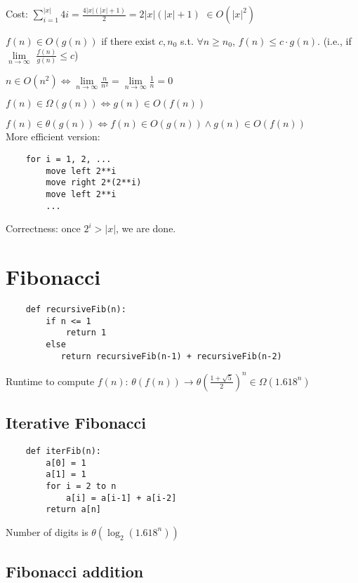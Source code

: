 \documentclass[english,openany]{book}
\begin{document}
    Cost: $\sum_{i=1}^{|x|} 4i = \frac{4|x|(|x|+1)}{2} = 2|x|(|x|+1)$ $\in O(|x|^2)$

    $f(n) \in O(g(n))$ if there exist $c, n_0$ s.t. $\forall n \geq n_0$, $f(n) \leq c \cdot g(n)$. (i.e., if $\lim\limits_{n \rightarrow \infty}$ $\frac{f(n)}{g(n)} \leq c$)

    $n \in O(n^2) \iff \lim\limits_{n \rightarrow \infty} \frac{n}{n^2} = \lim\limits_{n \rightarrow \infty} \frac{1}{n} = 0$

    $f(n) \in \Omega(g(n)) \iff g(n) \in O(f(n))$

    $f(n) \in \theta(g(n)) \iff  f(n) \in O(g(n)) \wedge g(n) \in O(f(n))$\\

    \newpage
    More efficient version:

    \begin{lstlisting}
    for i = 1, 2, ...
        move left 2**i
        move right 2*(2**i)
        move left 2**i
        ...
    \end{lstlisting}

    Correctness: once $2^i > |x|$, we are done.\\

    \section{Fibonacci}

    \begin{lstlisting}
    def recursiveFib(n):
        if n <= 1
            return 1
        else
           return recursiveFib(n-1) + recursiveFib(n-2)
    \end{lstlisting}

    Runtime to compute $f(n)$: $\theta(f(n)) \rightarrow \theta(\frac{1+\sqrt{5}}{2})^n \in \Omega(1.618^n)$\\

    \subsection{Iterative Fibonacci}

    \begin{lstlisting}
    def iterFib(n):
        a[0] = 1
        a[1] = 1
        for i = 2 to n
            a[i] = a[i-1] + a[i-2]
        return a[n]
    \end{lstlisting}

    Number of digits is $\theta(\log_2 (1.618^n))$


    \subsection{Fibonacci addition}
\end{document}
